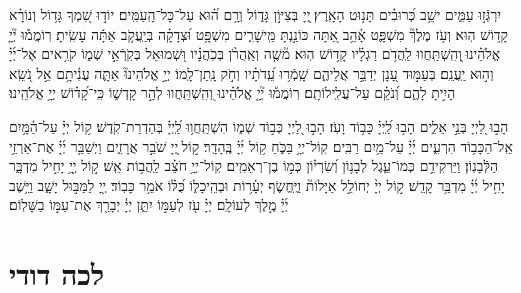 \documentclass[twoside, openany, parskip=half, 11pt]{book}
\begin{document}
 יִרְגְּֿז֣וּ עַמִּ֑ים ישֵׁ֥ב כְּ֝רוּבִ֗ים תָּנ֥וּט הָאָֽרֶץ׃ 
 ֖יְיָ בְּצִיּוֹ֣ן גָּד֑וֹל וְרָ֥ם ה֝֗וּא עַל־כָּל־הָֽעַמִּֽים׃ 
 יוֹד֣וּ שִׁ֭מְךָ גָּד֥וֹל וְנוֹרָ֗א קָד֥וֹשׁ הֽוּא׃ 
 וְעֹ֥ז מֶלֶךְ֘ מִשְׁפָּ֢ט אָ֫הֵ֥ב אַ֭תָּה כּוֹנַ֣נְתָּ מֵּֽישָׁרִ֑ים מִשְׁפָּ֥ט וּ֝צְדָקָ֗ה בְּיַֽעֲקֹ֤ב אַתָּ֬ה עָשִֽׂיתָ׃ 
 רֽוֹמֲמ֡וּ יְ֘יָ֤ אֱלֹהֵ֗ינוּ ֖וְהִֽשְׁתַּֽחֲווּ לַֽהֲדֹ֥ם רַגְלָ֗יו קָד֥וֹשׁ הֽוּא׃ 
 מ֘שֶׁ֤ה וְאַֽהֲרֹ֨ן בְּכֹֽהֲנָ֗יו וּ֭שְׁמוּאֵל בְּקֹֽרְֿאֵ֣י שְׁמ֑וֹ קֹרִ֥אים אֶל־יְ֜יָ֗ וְה֣וּא יַֽעֲנֵֽם׃ 
 בְּעַמּ֣וּד עָ֭נָן יְדַבֵּ֣ר אֲלֵיהֶ֑ם שָֽׁמְֿר֥וּ עֵֽ֝דֹתָ֗יו וְחֹ֣ק נָֽתַן־לָֽמוֹ׃ 
 יְיָ֣ אֱלֹהֵינוּ֘ אַתָּ֢ה עֲנִ֫יתָ֥ם אֵ֣ל נֹ֭שֵֽׂא הָיִ֣יתָ לָהֶ֑ם וְ֝נֹקֵ֗ם עַל־עֲלִֽילוֹתָֽם׃ 
 רֽוֹמֲמ֡וּ יְ֘יָ֤ אֱלֹהֵ֗ינוּ וְ֭הִֽשְׁתַּֽחֲווּ לְהַ֣ר קָדְשׁ֑וֹ כִּֽי־קָ֝ד֗וֹשׁ יְיָ֥ אֱלֹהֵֽינוּ׃

 הָב֣וּ לַ֭יְיָ בְּנֵ֣י אֵלִ֑ים הָב֥וּ לַֽ֝יְיָ֗ כָּב֥וֹד וָעֹֽז׃ 
 הָב֣וּ לַ֭יְיָ כְּב֣וֹד שְׁמ֑וֹ הִשְׁתַּֽחֲו֥וּ לַֽ֝יְיָ֗ בְּהַדְרַת־קֹֽדֶשׁ׃ 
 ק֥וֹל יְיָ֗ עַל־הַ֫מָּ֥יִם אֵֽל־הַכָּב֥וֹד הִרְעִ֑ים יְ֜יָ֗ עַל־מַ֥יִם רַבִּֽים׃ 
 קֽוֹל־יְיָ֥ בַּכֹּ֑חַ ק֥וֹל יְ֜יָ֗ בֶּֽהָדָֽר׃ 
 ק֣וֹל ֖יְיָ שֹׁבֵ֣ר אֲרָזִ֑ים וַיְשַׁבֵּ֥ר יְ֜יָ֗ אֶת־אַרְזֵ֥י הַלְּֿבָנֽוֹן׃ 
 וַיַּרְקִידֵ֥ם כְּמוֹ־עֵ֑גֶל לְבָנ֥וֹן וְ֝שִׂרְי֗וֹן כְּמ֣וֹ בֶן־רְאֵמִֽים׃ 
 קֽוֹל־יְיָ֥ חֹצֵ֗ב לַֽהֲב֥וֹת אֵֽשׁ׃ 
 ק֣וֹל יְ֖יָ֥ יָחִ֣יל מִדְבָּ֑ר יָחִ֥יל יְ֜יָ֗ מִדְבַּ֥ר קָדֵֽשׁ׃ 
 ק֣וֹל יְיָ֨ יְחוֹלֵ֣ל אַיָּלוֹת֘ וַיֶּֽחֱשׂ֢ף יְעָ֫ר֥וֹת וּבְהֵֽיכָל֑וֹ כֻּ֝לּ֗וֹ אֹמֵ֥ר כָּבֽוֹד׃ 
 יְ֖יָ לַמַּבּ֣וּל יָשָׁ֑ב וַיֵּ֥שֶׁב יְ֜יָ֗ מֶ֣לֶךְ לְעוֹלָֽם׃ 
יְיָ֗ עֹ֖ז לְעַמּ֣וֹ יִתֵּ֑ן יְיָ֓ יְבָרֵ֖ךְ אֶת־עַמּ֣וֹ בַשָּׁלֽוֹם׃


\section*{ לכה דודי }

\newcommand{\lechadodi}{\textbf{לְכָה דוֹדִי לִקְרַאת כַּלָּה פְּנֵי שַׁבָּת נְקַבְּֿלָה:}}
\end{document}
